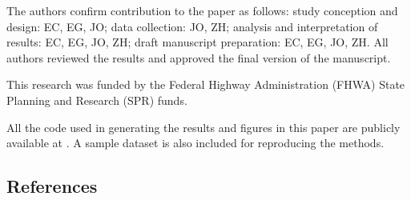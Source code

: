\documentclass[times]{TRR}
\begin{document}
\begin{ac}
The authors confirm contribution to the paper as follows: study conception and design: EC, EG, JO; data collection: JO, ZH; analysis and interpretation of results: EC, EG, JO, ZH; draft manuscript preparation: EC, EG, JO, ZH. All authors reviewed the results and approved the final version of the manuscript. 
\end{ac}

\begin{funding}
This research was funded by the Federal Highway Administration (FHWA) State Planning and Research (SPR) funds.
\end{funding}

\begin{das}
All the code used in generating the results and figures in this paper are publicly available at \url{}. A sample dataset is also included for reproducing the methods.
\end{das}


\subsection{References}
%



 

 
\end{document}

